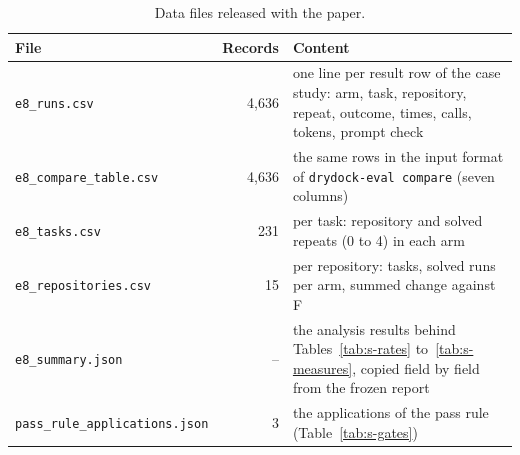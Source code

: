 \begin{table}[!htb]
\centering
\caption{Data files released with the paper.}\label{tab:s-files}
\footnotesize
\begin{tabular}{lrp{9.2cm}}
\toprule
File & Records & Content \\
\midrule
\texttt{e8\_runs.csv} & 4{,}636 & one line per result row of the case study: arm, task, repository, repeat, outcome, times, calls, tokens, prompt check \\
\texttt{e8\_compare\_table.csv} & 4{,}636 & the same rows in the input format of \texttt{drydock-eval compare} (seven columns) \\
\texttt{e8\_tasks.csv} & 231 & per task: repository and solved repeats (0 to 4) in each arm \\
\texttt{e8\_repositories.csv} & 15 & per repository: tasks, solved runs per arm, summed change against F \\
\texttt{e8\_summary.json} & -- & the analysis results behind Tables~\ref{tab:s-rates} to~\ref{tab:s-measures}, copied field by field from the frozen report \\
\texttt{pass\_rule\_applications.json} & 3 & the applications of the pass rule (Table~\ref{tab:s-gates}) \\
\bottomrule
\end{tabular}
\end{table}
